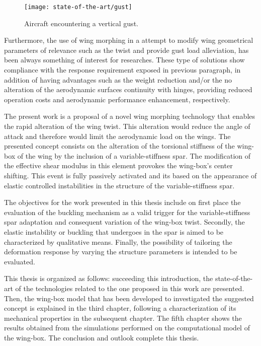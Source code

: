 \begin{figure}[!htpb]
  \centering
  \texttt{[image: state-of-the-art/gust]}
  \caption[Aircraft encountering a vertical gust]{Aircraft encountering a vertical gust. \cite{JECooper2007}}\label{fig:gust}
\end{figure}

Furthermore, the use of wing morphing in a attempt to modify wing geometrical parameters of relevance such as the twist and provide gust load alleviation, has been always something of interest for researches. These type of solutions show compliance with the response requirement exposed in  previous paragraph, in addition of having advantages such as the weight reduction and/or the no alteration of the aerodynamic surfaces continuity with hinges, providing reduced operation costs and aerodynamic performance enhancement, respectively. 

The present work is a proposal of a novel wing morphing technology that enables the rapid alteration of the wing twist. This alteration would reduce the angle of attack and therefore would limit the aerodynamic load on the wings. The presented concept consists on the alteration of the torsional stiffness of the wing-box of the wing by the inclusion of a variable-stiffness spar. The modification of the effective shear modulus in this element provokes the wing-box's center shifting. This event is fully passively activated and its based on the appearance of elastic controlled instabilities in the structure of the variable-stiffness spar.

The objectives for the work presented in this thesis include on first place the evaluation of the buckling mechanism as a valid trigger for the variable-stiffness spar adaptation and consequent variation of the wing-box twist. Secondly, the elastic instability or buckling that undergoes in the spar is aimed to be characterized by qualitative means. Finally, the possibility of tailoring the deformation response by varying the structure parameters is intended to be evaluated. 

This thesis is organized as follows: succeeding this introduction, the state-of-the-art of the technologies related to the one proposed in this work are presented. Then, the wing-box model that has been developed to investigated the suggested concept is explained in the third chapter, following a characterization of its mechanical properties in the subsequent chapter. The fifth chapter shows the results obtained from the simulations performed on the computational model of the wing-box. The conclusion and outlook complete this thesis.